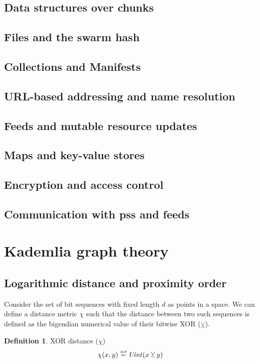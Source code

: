 \documentclass[a4paper,10pt,fullpage]{article}
\numberwithin{equation}{section}
\newcommand\defeq{\overset{\textrm{\tiny  def}}{=}}
\providecommand{\xor}{\veebar}
\theoremstyle{definition}
\newtheorem{definition}{Definition}[section]
\begin{document}
\subsection{Data structures over chunks}
\subsection{Files and the swarm hash}
\subsection{Collections and Manifests}
\subsection{URL-based addressing and name resolution}
\subsection{Feeds and mutable resource updates}
\subsection{Maps and key-value stores}
\subsection{Encryption and access control}
\subsection{Communication with pss and feeds}

\cite{ethersphere2016smash}
\cite{ethersphere2016sw3}
\cite{maymounkov2002kademlia}
\cite{heep2010r}
  

\appendix
\section{Kademlia graph theory}
\subsection{Logarithmic distance and proximity order}
Consider the set of bit sequences with fixed length $d$ as points in a space. We can define a distance metric $\chi$ such that
the distance between two such sequences is defined as the bigendian  numerical value of their bitwise XOR ($\xor$).

\begin{definition}{XOR distance ($\chi$)}\label{def:xor}
\begin{equation}
\chi(x, y) \defeq \mathit{Uint}(x  \xor y)
\end{equation}
\end{definition}
\end{document}

